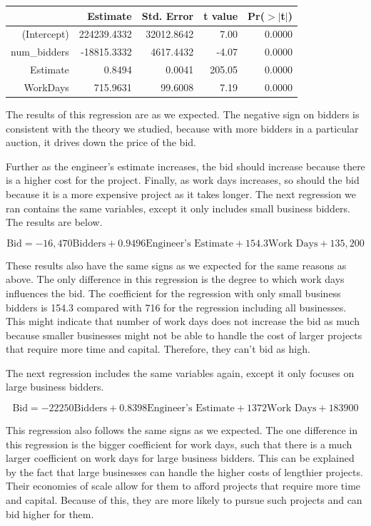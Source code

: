 \begin{table}[ht]
\begin{tabular}{rrrrr}
  \toprule
 & Estimate & Std. Error & t value & Pr($>$$|$t$|$) \\ 
  \midrule
(Intercept) & 224239.4332 & 32012.8642 & 7.00 & 0.0000 \\ 
  num\_bidders & -18815.3332 & 4617.4432 & -4.07 & 0.0000 \\ 
  Estimate & 0.8494 & 0.0041 & 205.05 & 0.0000 \\ 
  WorkDays & 715.9631 & 99.6008 & 7.19 & 0.0000 \\ 
   \bottomrule
\end{tabular}
\end{table}

The results of this regression are as we expected. The negative sign on bidders
is consistent with the theory we studied, because with more bidders in a
particular auction, it drives down the price of the bid.

Further as the engineer’s estimate increases, the bid should
increase because there is a higher cost for the project. Finally, as work days
increases, so should the bid because it is a more expensive project as it takes
longer. The next regression we ran contains the same variables, except it only
includes small business bidders. The results are below.

\[
\text{Bid} = -16,470 \text{Bidders} + 0.9496 \text{Engineer’s Estimate} +
154.3 \text{Work Days} + 135,200
\]

These results also have the same signs as we expected for the same reasons as
above. The only difference in this regression is the degree to which work days
influences the bid. The coefficient for the regression with only small business
bidders is 154.3 compared with 716 for the regression including all businesses.
This might indicate that number of work days does not increase the bid as much
because smaller businesses might not be able to handle the cost of larger
projects that require more time and capital. Therefore, they can’t bid as high.

The next regression includes the same variables again, except it only focuses
on large business bidders.

\[
\text{Bid} = -22250 \text{Bidders} + 0.8398 \text{Engineer’s Estimate} +
1372 \text{Work Days} + 183900
\]

This regression also follows the same signs as we expected. The one difference
in this regression is the bigger coefficient for work days, such that there is
a much larger coefficient on work days for large business bidders. This can be
explained by the fact that large businesses can handle the higher costs of
lengthier projects. Their economies of scale allow for them to afford projects
that require more time and capital. Because of this, they are more likely
to pursue such projects and can bid higher for them.


